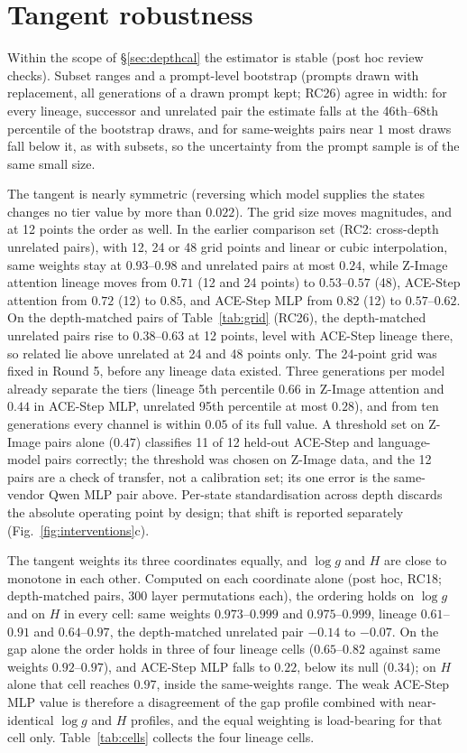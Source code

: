 \section{Tangent robustness}\label{supp:tangent}
Within the scope of \S\ref{sec:depthcal} the estimator is stable (post hoc review checks). Subset ranges and a prompt-level bootstrap (prompts drawn with replacement, all generations of a drawn prompt kept; RC26) agree in width: for every lineage, successor and unrelated pair the estimate falls at the 46th--68th percentile of the bootstrap draws, and for same-weights pairs near $1$ most draws fall below it, as with subsets, so the uncertainty from the prompt sample is of the same small size.

The tangent is nearly symmetric (reversing which model supplies the states changes no tier value by more than $0.022$). The grid size moves magnitudes, and at 12 points the order as well. In the earlier comparison set (RC2: cross-depth unrelated pairs), with 12, 24 or 48 grid points and linear or cubic interpolation, same weights stay at $0.93$--$0.98$ and unrelated pairs at most $0.24$, while Z-Image attention lineage moves from $0.71$ (12 and 24 points) to $0.53$--$0.57$ (48), ACE-Step attention from $0.72$ (12) to $0.85$, and ACE-Step MLP from $0.82$ (12) to $0.57$--$0.62$. On the depth-matched pairs of Table~\ref{tab:grid} (RC26), the depth-matched unrelated pairs rise to $0.38$--$0.63$ at 12 points, level with ACE-Step lineage there, so related lie above unrelated at 24 and 48 points only. The 24-point grid was fixed in Round 5, before any lineage data existed. Three generations per model already separate the tiers (lineage 5th percentile $0.66$ in Z-Image attention and $0.44$ in ACE-Step MLP, unrelated 95th percentile at most $0.28$), and from ten generations every channel is within $0.05$ of its full value. A threshold set on Z-Image pairs alone ($0.47$) classifies 11 of 12 held-out ACE-Step and language-model pairs correctly; the threshold was chosen on Z-Image data, and the 12 pairs are a check of transfer, not a calibration set; its one error is the same-vendor Qwen MLP pair above. Per-state standardisation across depth discards the absolute operating point by design; that shift is reported separately (Fig.~\ref{fig:interventions}c).

The tangent weights its three coordinates equally, and $\log g$ and $H$ are close to monotone in each other. Computed on each coordinate alone (post hoc, RC18; depth-matched pairs, 300 layer permutations each), the ordering holds on $\log g$ and on $H$ in every cell: same weights $0.973$--$0.999$ and $0.975$--$0.999$, lineage $0.61$--$0.91$ and $0.64$--$0.97$, the depth-matched unrelated pair $-0.14$ to $-0.07$. On the gap alone the order holds in three of four lineage cells ($0.65$--$0.82$ against same weights $0.92$--$0.97$), and ACE-Step MLP falls to $0.22$, below its null ($0.34$); on $H$ alone that cell reaches $0.97$, inside the same-weights range. The weak ACE-Step MLP value is therefore a disagreement of the gap profile combined with near-identical $\log g$ and $H$ profiles, and the equal weighting is load-bearing for that cell only. Table~\ref{tab:cells} collects the four lineage cells.

